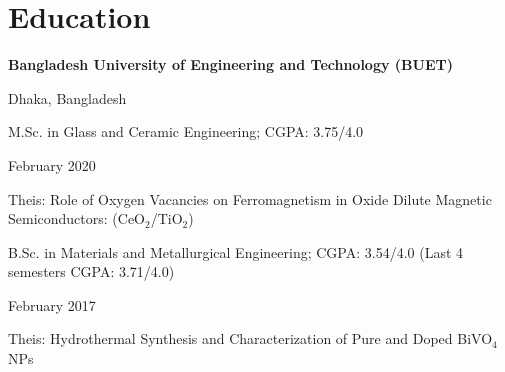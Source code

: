 
\section{Education}
    \begin{minipage}{.75\linewidth} \begin{flushleft}
    		\textbf{Bangladesh University of Engineering and Technology (BUET)}
    	\end{flushleft} \end{minipage}
    \hfill 
    \begin{minipage}{.20\linewidth}\begin{flushright}
    	 Dhaka, Bangladesh
    	\end{flushright}\end{minipage}
    	
    	\begin{minipage}{.75\linewidth} \begin{flushleft}
    		M.Sc. in Glass and Ceramic Engineering;  CGPA: 3.75/4.0\\
    	\end{flushleft} \end{minipage}
    \hfill 
    \begin{minipage}{.20\linewidth}\begin{flushright}
    	 February 2020
    	\end{flushright}\end{minipage} 
	 Theis: Role of Oxygen Vacancies on Ferromagnetism in Oxide Dilute Magnetic Semiconductors: (CeO$_2$/TiO$_{2}$)\\
	
   		\begin{minipage}{.85\linewidth} \begin{flushleft}
    		B.Sc. in Materials and Metallurgical Engineering;  CGPA: 3.54/4.0 (Last 4 semesters CGPA: 3.71/4.0)\\
    	\end{flushleft} \end{minipage}
    \hfill 
    \begin{minipage}{.13\linewidth}\begin{flushright}
    	 February 2017
    	\end{flushright}\end{minipage}
	 Theis: Hydrothermal Synthesis and Characterization of Pure and Doped BiVO$_{4}$ NPs\\
	 \vspace{2pt}
	  

